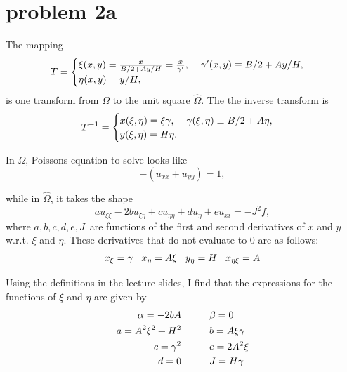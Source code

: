 \documentclass[aps, 12pt]{revtex4}
\begin{document}
\section*{problem 2a}
The mapping
\begin{align*}
    T = \begin{cases}
        \xi(x, y) = \frac{x}{B/2 + Ay/H} = \frac{x}{\gamma'}, \hspace{4mm} \gamma'(x, y) \equiv B/2 + Ay/H,
        \\
        \eta(x, y) = y / H,
    \end{cases}
\end{align*}
is one transform from $\Omega$ to the unit square $\hat{\Omega}$. The the inverse transform is
\begin{align*}
    T^{-1} = \begin{cases}
        x(\xi, \eta) = \xi\gamma, \hspace{4mm}\gamma(\xi, \eta) \equiv B/2 + A\eta,
        \\
        y(\xi, \eta) = H\eta.
    \end{cases}
\end{align*}

\newcommand{\xegamma}{\gamma(\xi, \eta)}

In $\Omega$, Poissons equation to solve looks like
\begin{equation*}
    -(u_{xx} + u_{yy}) = 1,
\end{equation*}

while in $\hat{\Omega}$, it takes the shape
\begin{equation}\label{eq:ddu}
    au_{\xi\xi}-2bu_{\xi\eta}+cu_{\eta\eta} + du_{\eta}+eu_{xi} = -J^2f,
\end{equation}
where $a, b, c, d, e, J$ are functions of the first and second derivatives of $x$ and $y$ w.r.t. $\xi$ and $\eta$. These derivatives that do not evaluate to 0 are as follows:
\begin{align*}
    x_{\xi} = \gamma \hspace{3mm} x_{\eta} = A\xi \hspace{3mm} y_{\eta} = H \hspace{3mm} x_{\eta\xi} = A
\end{align*}

Using the definitions in the lecture slides, I find that the expressions for the functions of $\xi$ and $\eta$ are given by
\begin{align*}
    \alpha  = -2bA  \hspace{5mm} & \hspace{5mm} \beta   = 0
    \\
    a    = A^2\xi^2 + H^2 \hspace{5mm} & \hspace{5mm} b  = A\xi\gamma
    \\
    c   = \gamma^2\hspace{5mm} & \hspace{5mm} e    = 2A^2\xi
    \\
    d     = 0 \hspace{5mm} & \hspace{5mm}J   = H\gamma
\end{align*}
\end{document}
